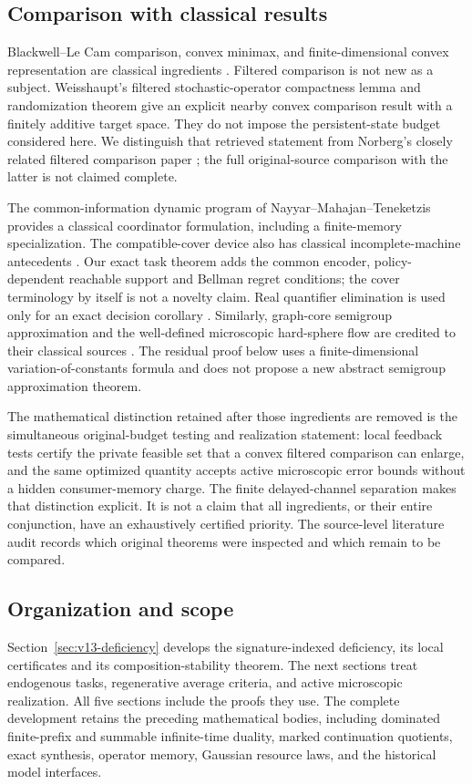 \subsection{Comparison with classical results}
Blackwell--Le Cam comparison, convex minimax, and finite-dimensional convex
representation are classical ingredients \cite{Blackwell1953,LeCam1964}.
Filtered comparison is not new as a subject. Weisshaupt's filtered
stochastic-operator compactness lemma and randomization theorem
\cite[Lemma 1 and Theorem 5]{Weisshaupt2002} give an explicit nearby
convex comparison result with a finitely additive target space. They do
not impose the persistent-state budget considered here. We distinguish
that retrieved statement from Norberg's closely related filtered
comparison paper \cite{Norberg2002}; the full original-source comparison
with the latter is not claimed complete.

The common-information dynamic program of
Nayyar--Mahajan--Teneketzis \cite[Theorem 3 and Corollary 5]{NayyarMahajanTeneketzis2013}
provides a classical coordinator formulation, including a finite-memory
specialization. The compatible-cover device also has classical
incomplete-machine antecedents \cite{PaullUnger1959}. Our exact task theorem
adds the common encoder, policy-dependent reachable support and Bellman
regret conditions; the cover terminology by itself is not a novelty claim.
Real quantifier elimination is used only for an exact decision corollary
\cite{Basu2014}. Similarly, graph-core semigroup approximation and the
well-defined microscopic hard-sphere flow are credited to their classical
sources \cite{Trotter1958,GallagherSaintRaymondTexier}. The residual proof below uses a
finite-dimensional variation-of-constants formula and does not propose a
new abstract semigroup approximation theorem.

The mathematical distinction retained after those ingredients are removed
is the simultaneous original-budget testing and realization statement:
local feedback tests certify the private feasible set that a convex
filtered comparison can enlarge, and the same optimized quantity accepts
active microscopic error bounds without a hidden consumer-memory charge.
The finite delayed-channel separation makes that distinction explicit.
It is not a claim that all ingredients, or their entire conjunction, have
an exhaustively certified priority. The source-level literature audit
records which original theorems were inspected and which remain to be
compared.

\subsection{Organization and scope}
Section~\ref{sec:v13-deficiency} develops the signature-indexed deficiency,
its local certificates and its composition-stability theorem. The next
sections treat endogenous tasks, regenerative average criteria, and active
microscopic realization. All five sections include the proofs they use.
The complete development retains the preceding mathematical bodies,
including dominated finite-prefix and summable infinite-time duality,
marked continuation quotients, exact synthesis, operator memory, Gaussian
resource laws, and the historical model interfaces.


